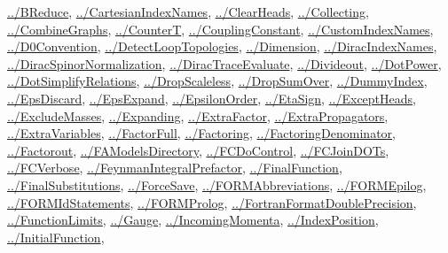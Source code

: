 \documentclass[../FeynCalcManual.tex]{subfiles}
\begin{document}
\begin{itemize}
  \hyperlink{../breduce}{../BReduce},
  \hyperlink{../cartesianindexnames}{../CartesianIndexNames},
  \hyperlink{../clearheads}{../ClearHeads},
  \hyperlink{../collecting}{../Collecting},
  \hyperlink{../combinegraphs}{../CombineGraphs},
  \hyperlink{../countert}{../CounterT},
  \hyperlink{../couplingconstant}{../CouplingConstant},
  \hyperlink{../customindexnames}{../CustomIndexNames},
  \hyperlink{../d0convention}{../D0Convention},
  \hyperlink{../detectlooptopologies}{../DetectLoopTopologies},
  \hyperlink{../dimension}{../Dimension},
  \hyperlink{../diracindexnames}{../DiracIndexNames},
  \hyperlink{../diracspinornormalization}{../DiracSpinorNormalization},
  \hyperlink{../diractraceevaluate}{../DiracTraceEvaluate},
  \hyperlink{../divideout}{../Divideout},
  \hyperlink{../dotpower}{../DotPower},
  \hyperlink{../dotsimplifyrelations}{../DotSimplifyRelations},
  \hyperlink{../dropscaleless}{../DropScaleless},
  \hyperlink{../dropsumover}{../DropSumOver},
  \hyperlink{../dummyindex}{../DummyIndex},
  \hyperlink{../epsdiscard}{../EpsDiscard},
  \hyperlink{../epsexpand}{../EpsExpand},
  \hyperlink{../epsilonorder}{../EpsilonOrder},
  \hyperlink{../etasign}{../EtaSign},
  \hyperlink{../exceptheads}{../ExceptHeads},
  \hyperlink{../excludemasses}{../ExcludeMasses},
  \hyperlink{../expanding}{../Expanding},
  \hyperlink{../extrafactor}{../ExtraFactor},
  \hyperlink{../extrapropagators}{../ExtraPropagators},
  \hyperlink{../extravariables}{../ExtraVariables},
  \hyperlink{../factorfull}{../FactorFull},
  \hyperlink{../factoring}{../Factoring},
  \hyperlink{../factoringdenominator}{../FactoringDenominator},
  \hyperlink{../factorout}{../Factorout},
  \hyperlink{../famodelsdirectory}{../FAModelsDirectory},
  \hyperlink{../fcdocontrol}{../FCDoControl},
  \hyperlink{../fcjoindots}{../FCJoinDOTs},
  \hyperlink{../fcverbose}{../FCVerbose},
  \hyperlink{../feynmanintegralprefactor}{../FeynmanIntegralPrefactor},
  \hyperlink{../finalfunction}{../FinalFunction},
  \hyperlink{../finalsubstitutions}{../FinalSubstitutions},
  \hyperlink{../forcesave}{../ForceSave},
  \hyperlink{../formabbreviations}{../FORMAbbreviations},
  \hyperlink{../formepilog}{../FORMEpilog},
  \hyperlink{../formidstatements}{../FORMIdStatements},
  \hyperlink{../formprolog}{../FORMProlog},
  \hyperlink{../fortranformatdoubleprecision}{../FortranFormatDoublePrecision},
  \hyperlink{../functionlimits}{../FunctionLimits},
  \hyperlink{../gauge}{../Gauge},
  \hyperlink{../incomingmomenta}{../IncomingMomenta},
  \hyperlink{../indexposition}{../IndexPosition},
  \hyperlink{../initialfunction}{../InitialFunction},

\end{itemize}
\end{document}
